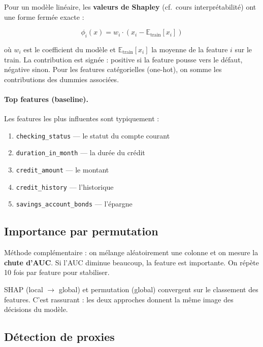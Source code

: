 \documentclass[11pt, a4paper]{article}
\begin{document}
Pour un mod\`{e}le lin\'{e}aire, les \textbf{valeurs de Shapley} (cf.~cours interpr\'{e}tabilit\'{e}) ont une forme ferm\'{e}e exacte :

$$\phi_i(x) = w_i \cdot \left(x_i - \mathbb{E}_{\text{train}}[x_i]\right)$$

\noindent o\`{u} $w_i$ est le coefficient du mod\`{e}le et $\mathbb{E}_{\text{train}}[x_i]$ la moyenne de la feature $i$ sur le train. La contribution est sign\'{e}e : positive si la feature pousse vers le d\'{e}faut, n\'{e}gative sinon. Pour les features cat\'{e}gorielles (one-hot), on somme les contributions des dummies associ\'{e}es.

\paragraph{Top features (baseline).} Les features les plus influentes sont typiquement :
\begin{enumerate}
    \item \texttt{checking\_status} --- le statut du compte courant
    \item \texttt{duration\_in\_month} --- la dur\'{e}e du cr\'{e}dit
    \item \texttt{credit\_amount} --- le montant
    \item \texttt{credit\_history} --- l'historique
    \item \texttt{savings\_account\_bonds} --- l'\'{e}pargne
\end{enumerate}

\subsection{Importance par permutation}

M\'{e}thode compl\'{e}mentaire : on m\'{e}lange al\'{e}atoirement une colonne et on mesure la \textbf{chute d'AUC}. Si l'AUC diminue beaucoup, la feature est importante. On r\'{e}p\`{e}te 10 fois par feature pour stabiliser.

\begin{leconbox}
SHAP (local $\to$ global) et permutation (global) convergent sur le classement des features. C'est rassurant : les deux approches donnent la m\^{e}me image des d\'{e}cisions du mod\`{e}le.
\end{leconbox}

\subsection{D\'{e}tection de proxies}
\end{document}
